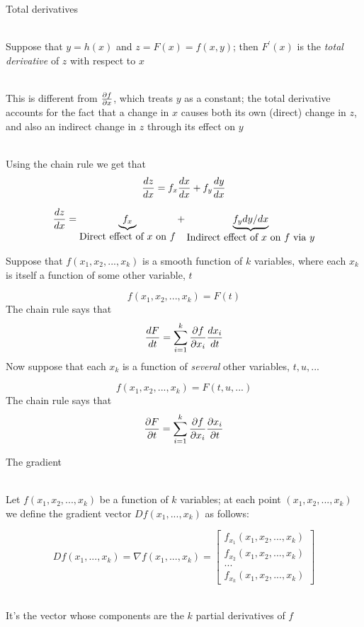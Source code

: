 \documentclass[10pt]{seminar}
\begin{document}
\begin{slide}
\newslide

Total derivatives

\ \\Suppose that $y=h(x)$ and $z=F(x)=f(x, y)$; then $F^\prime(x)$ is the \textit{total derivative} of $z$ with respect to $x$

\ \\This is different from ${{\partial f}\over{\partial x}}$, which treats $y$ as a constant; the total derivative accounts for the fact that a change in $x$ causes both its own (direct) change in $z$, and also an indirect change in $z$ through its effect on $y$

\ \\Using the chain rule we get that $${{dz}\over{dx}}=f_x {{dx}\over{dx}}+f_y{{ dy}\over{ dx}}$$

$${{dz}\over{dx}}=\underbrace{f_x}_{\hbox{Direct effect of $x$ on $f$} }+\underbrace{f_y dy/dx}_{\hbox{Indirect effect of $x$ on $f$ via $y$}} $$
\newslide

Suppose that $f(x_1, x_2, ..., x_k)$ is a smooth function of $k$ variables, where each $x_k$ is itself a function of some other variable, $t$

$$f(x_1, x_2, ..., x_k) =F(t)$$
The chain rule says that $${{dF}\over{ dt}}=\sum_{i=1}^k {{\partial f}\over{\partial x_i}}{{ dx_i}\over{ dt}}$$
Now suppose that each $x_k$ is a function of \textit{several} other variables, $t, u, ...$

$$f(x_1, x_2, ..., x_k) =F(t, u, ...)$$
The chain rule says that $${{\partial F}\over{\partial t}}=\sum_{i=1}^k {{\partial f}\over{\partial x_i}}{{\partial x_i}\over{\partial t}}$$


\newslide

The gradient

\ \\Let $f(x_1, x_2, ..., x_k) $ be a function of $k$ variables; at each point $(x_1, x_2, ..., x_k)$ we define the gradient vector $D f(x_1, ..., x_k)$ as follows:

$$D f(x_1, ..., x_k)= \nabla f (x_1, ..., x_k)= \begin{bmatrix}f_{x_1}(x_1, x_2, ..., x_k) \\
f_{x_2}(x_1, x_2, ..., x_k) \\
...\\
f_{x_k}(x_1, x_2, ..., x_k) 
\end{bmatrix}$$

\ \\It's the vector whose components are the $k$ partial derivatives of $f$



\end{slide}
\end{document}
